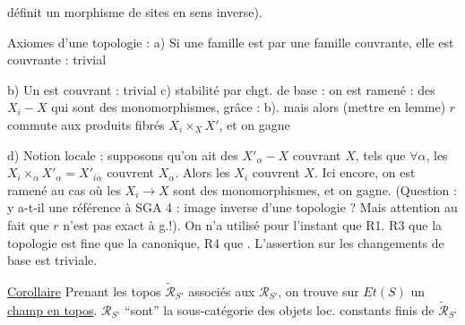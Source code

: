 définit un morphisme de sites en sens inverse).

Axiomes d'une topologie : a) Si une famille est  par une famille couvrante, elle est couvrante : trivial

b) Un  est couvrant : trivial \quad c) stabilité par chgt. de base : on est ramené : des $X_i-X$ qui sont des monomorphismes, grâce : b).
mais alors (mettre en lemme) $r$ commute aux produits fibrés $X_i\times_X X'$, et on gagne

d) Notion locale : supposons qu'on ait des $X'_\alpha-X$ couvrant $X$, tels que $\forall\alpha$, les $X_i\times_\alpha X'_\alpha=X'_{i\alpha}$ couvrent $X_\alpha$. Alors les $X_i$ couvrent $X$. Ici encore, on est ramené au cas où les $X_i\to X$ sont des monomorphismes, et on gagne.
(Question : y a-t-il une référence à SGA 4 : image inverse d'une topologie ? Mais attention au fait que $r$ n'est pas exact à g.!). On n'a utilisé pour l'instant que R1. R3  que la topologie est  fine que la canonique, R4 que . L'assertion sur les changements de base est triviale.

\uline{Corollaire} Prenant les topos  $\widetilde{\mathscr R}_{S'}$ associés aux $\mathscr R_{S'}$, on trouve sur $Et(S)$ un \uline{champ en topos}. $\mathscr R_{S'}$ ``sont'' la sous-catégorie des objets loc. constants finis de $\widetilde{\mathscr R}_{S'}$

